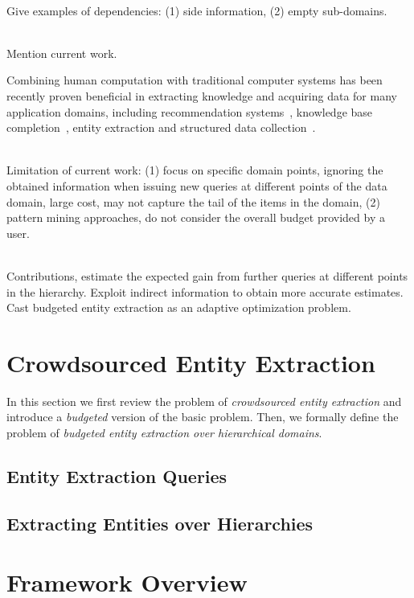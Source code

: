 \documentclass{sig-alternate}
\begin{document}
\ \\Give examples of dependencies: (1) side information, (2) empty sub-domains.

\ \\Mention current work.

Combining human computation with traditional computer systems has been recently proven beneficial in extracting knowledge and acquiring data for many application domains, including recommendation systems~\cite{amsterdamer:2014}, knowledge base completion~\cite{kondredi:2014, west:2014}, entity extraction and structured data collection~\cite{trushkowsky:2013, park:2014}. 

\ \\Limitation of current work: (1) focus on specific domain points, ignoring the obtained information when issuing new queries at different points of the data domain, large cost, may not capture the tail of the items in the domain, (2) pattern mining approaches, do not consider the overall budget provided by a user. 

\ \\Contributions, estimate the expected gain from further queries at different points in the hierarchy. Exploit indirect information to obtain more accurate estimates. Cast budgeted entity extraction as an adaptive optimization problem. 


\section{Crowdsourced Entity Extraction}
In this section we first review the problem of {\em crowdsourced entity extraction} and introduce a {\em budgeted} version of the basic problem. Then, we formally define the problem of {\em budgeted entity extraction over hierarchical domains}. 

\subsection{Entity Extraction Queries}

\subsection{Extracting Entities over Hierarchies}

\section{Framework Overview}
\subsection{}
\end{document}

